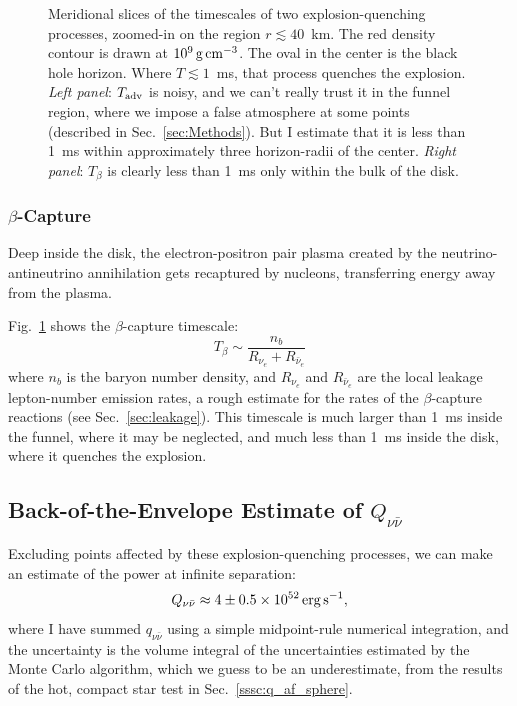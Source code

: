 \begin{figure}
\begin{subfigure}{.45\textwidth}
  \end{subfigure}
  \caption[Colormaps of explosion-quenching timescales]{
    Meridional slices of the timescales of two explosion-quenching processes,
    zoomed-in on the region $r\lesssim40$~km.
    The red density contour is drawn at $10^9\,{\rm g\,cm^{-3}}$.
    The oval in the center is the black hole horizon.
    Where $T\lesssim1$~ms, that process quenches the explosion.
    \emph{Left panel}: $T_{\rm adv}$ is noisy, and we can't really trust it in the
    funnel region, where we impose a false atmosphere at some points (described in
    Sec.~\ref{sec:Methods}).
    But I estimate that it is less than 1~ms within
    approximately three horizon-radii of the center.
    \emph{Right panel}: $T_\beta$ is clearly less than 1~ms only within the
    bulk of the disk.
  }
  \label{fig:timescales}
\end{figure}

\subsubsection{$\beta$-Capture}
\label{sssc:accretion_beta}
Deep inside the disk, the electron-positron pair plasma created by the
neutrino-antineutrino annihilation gets recaptured by nucleons, transferring
energy away from the plasma.

Fig.~\ref{fig:timescales} shows the $\beta$-capture timescale:
\begin{equation}
  T_\beta \sim \frac{n_b}{R_{\nu_e}+R_{\bar{\nu}_e}}
\end{equation}
where $n_b$ is the baryon number density, and $R_{\nu_e}$ and $R_{\bar{\nu}_e}$
are the local leakage lepton-number emission rates, a rough estimate for the
rates of the $\beta$-capture reactions (see Sec.~\ref{sec:leakage}).
This timescale is much larger than 1~ms inside the funnel, where it may be
neglected, and much less than 1~ms inside the disk, where it quenches the
explosion.

\subsection{Back-of-the-Envelope Estimate of $Q_{\nu\bar{\nu}}$}
\label{ssec:back_of_envelope_Q}
Excluding points affected by these explosion-quenching processes, we can make an
estimate of the power at infinite separation:
\begin{equation}
  Q_{\nu\bar{\nu}} \approx 4 \pm 0.5 \times 10^{52}\, {\rm erg\,s^{-1}}\nonumber,
\end{equation}
where I have summed $q_{\nu\bar{\nu}}$ using a simple midpoint-rule
numerical integration,
and the uncertainty is the volume integral of the uncertainties estimated by the
Monte Carlo algorithm, which we guess to be an underestimate, from the results
of the hot, compact star test in Sec.~\ref{sssc:q_af_sphere}.

